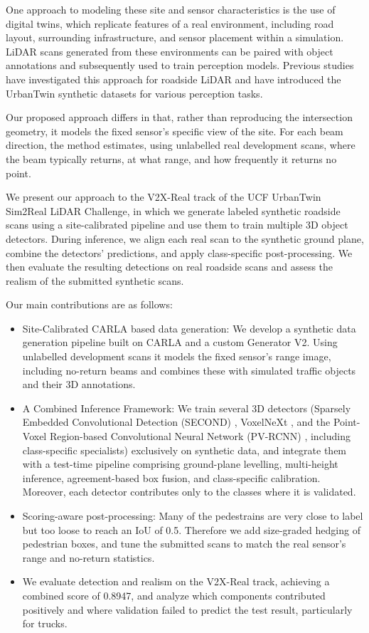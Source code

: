 \documentclass[conference]{IEEEtran}
\begin{document}
One approach to modeling these site and sensor characteristics is the use of digital twins, which replicate features of a real
environment, including road layout, surrounding infrastructure, and
sensor placement within a simulation. LiDAR scans generated from these environments can be paired with object annotations and subsequently used to train perception models. Previous studies have investigated this approach \cite{shahbaz2025urbantwin,shahbaz2026hifidelity,shahbaz2026urbantwin}
for roadside LiDAR and have introduced the UrbanTwin synthetic datasets
for various perception tasks.

Our proposed approach differs in that, rather than reproducing the intersection geometry, it models the fixed sensor's specific view of the site. For each beam direction, the method estimates, using unlabelled real development scans, where the beam typically returns, at what range, and how frequently it returns no point.

We present our approach to the V2X-Real track of the UCF UrbanTwin Sim2Real LiDAR Challenge, in which we generate labeled
synthetic roadside scans using a site-calibrated pipeline and use them
to train multiple 3D object detectors. During inference, we align each real scan to the synthetic ground plane, combine the detectors’ predictions, and apply class-specific post-processing. We then evaluate the resulting detections on real roadside scans and assess the realism of the submitted synthetic scans. 



Our main contributions are as follows:

\begin{itemize}
    \item Site-Calibrated CARLA based data generation: We develop a synthetic data generation pipeline built on CARLA and a custom Generator V2. Using unlabelled development scans it models the fixed sensor's range image, including no-return beams and combines these with simulated traffic objects and their 3D annotations.
    \item A Combined Inference Framework: We train several 3D detectors (Sparsely Embedded Convolutional Detection (SECOND) \cite{yan2018second}, VoxelNeXt \cite{chen2023voxelnext}, and the Point-Voxel Region-based Convolutional Neural Network (PV-RCNN) \cite{shi2020pvrcnn}, including class-specific specialists) exclusively on synthetic data, and integrate them with a test-time pipeline comprising ground-plane levelling, multi-height inference, agreement-based box fusion, and class-specific calibration. Moreover, each detector contributes only to the classes where it is validated.
    \item Scoring-aware post-processing: Many of the pedestrains are very close to label but too loose to reach an IoU of 0.5. Therefore we add size-graded hedging of pedestrian boxes, and tune the submitted scans to match the real sensor's range and no-return statistics.
    \item We evaluate detection and realism on the V2X-Real track, achieving a combined score of 0.8947, and analyze which components contributed positively and where validation failed to predict the test result, particularly for trucks.
\end{itemize}
\end{document}
